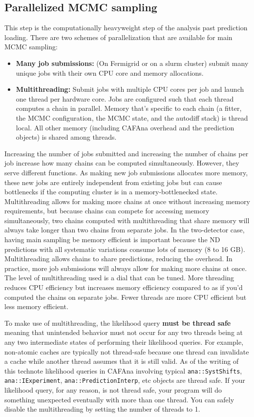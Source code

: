 \documentclass{article}
\begin{document}
\subsection{Parallelized MCMC sampling}
This step is the computationally heavyweight step of the analysis past prediction loading. There are two schemes of parallelization that are available for main MCMC sampling:
\begin{itemize}
  \item \textbf{Many job submissions:} (On Fermigrid or on a slurm cluster) submit many unique jobs with their own CPU core and memory allocations.
  \item \textbf{Multithreading:} Submit jobs with multiple CPU cores per job and launch one thread per hardware core. Jobs are configured such that each thread computes a chain in parallel. Memory that's specific to each chain (a fitter, the MCMC configuration, the MCMC state, and the autodiff stack) is thread local. All other memory (including CAFAna overhead and the prediction objects) is shared among threads.
\end{itemize}
Increasing the number of jobs submitted and increasing the number of chains per job increase how many chains can be computed simultaneously. However, they serve different functions. As making new job submissions allocates more memory, these new jobs are entirely independent from existing jobs but can cause bottlenecks if the computing cluster is in a memory-bottlenecked state.
Multithreading allows for making more chains at once without increasing memory requirements, but because chains can compete for accessing memory simultaneously, two chains computed with multithreading that share memory will always take longer than two chains from separate jobs.
In the two-detector case, having main sampling be memory efficient is important because the ND predictions with all systematic variations consume lots of memory (8 to 16 GB). Multithreading allows chains to share predictions, reducing the overhead.
In practice, more job submissions will always allow for making more chains at once. The level of multithreading used is a dial that can be tuned. More threading reduces CPU efficiency but increases memory efficiency compared to as if you'd computed the chains on separate jobs. Fewer threads are more CPU efficient but less memory efficient.

To make use of multithreading, the likelihood query \textbf{must be thread safe} meaning that unintended behavior must not occur for any two threads being at any two intermediate states of performing their likelihood queries.
For example, non-atomic caches are typically not thread-safe because one thread can invalidate a cache while another thread assumes that it is still valid.
As of the writing of this technote likelihood queries in CAFAna involving typical \texttt{ana::\-Syst\-Shifts}, \texttt{ana::\-IExperiment}, \texttt{ana::\-Prediction\-Interp}, etc objects are thread safe.
If your likelihood query, for any reason, is not thread safe, your program will do something unexpected eventually with more than one thread. You can safely disable the multithreading by setting the number of threads to 1.
\end{document}
